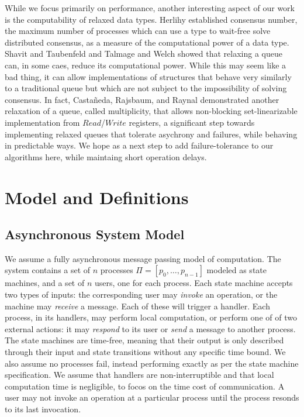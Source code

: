 \documentclass[a4paper,anonymous,USenglish]{lipics-v2021}
\theoremstyle{definition}
\begin{document}
While we focus primarily on performance, another interesting aspect of our work is the computability of relaxed data types.  Herlihy \cite{Herlihy91} established consensus number, the maximum number of processes which can use a type to wait-free solve distributed consensus, as a measure of the computational power of a data type.  Shavit and Taubenfeld \cite{ShavitTaubenfeld16} and Talmage and Welch \cite{TalmageWelch19} showed that relaxing a queue can, in some caes, reduce its computational power. While this may seem like a bad thing, it can allow implementations of structures that behave very similarly to a traditional queue but which are not subject to the impossibility of solving consensus.  In fact, Casta{\~n}eda, Rajsbaum, and Raynal \cite{CastanedaRajsbaumRaynal20} demonstrated another relaxation of a queue, called multiplicity, that allows non-blocking set-linearizable implementation from $Read$/$Write$ registers, a significant step towards implementing relaxed queues that tolerate asychrony and failures, while behaving in predictable ways.  We hope as a next step to add failure-tolerance to our algorithms here, while maintaing short operation delays.

\section{Model and Definitions}

\subsection{Asynchronous System Model}
We assume a fully asynchronous message passing model of computation.  The system contains a set of $n$ processes $\Pi = [p_0, \dots , p_{n-1}]$ modeled as state machines, and a set of $n$ users, one for each process.  Each state machine accepts two types of inputs: the corresponding user may \emph{invoke} an operation, or the machine may \emph{receive} a message.  Each of these will trigger a handler.  Each process, in its handlers, may perform local computation, or perform one of of two external actions: it may \emph{respond} to its user or \emph{send} a message to another process.  The state machines are time-free, meaning that their output is only described through their input and state transitions without any specific time bound.  We also assume no processes fail, instead performing exactly as per the state machine specification.  We assume that handlers are non-interruptible and that local computation time is negligible, to focos on the time cost of communication.  A user may not invoke an operation at a particular process until the process resonds to its last invocation.
\end{document}
